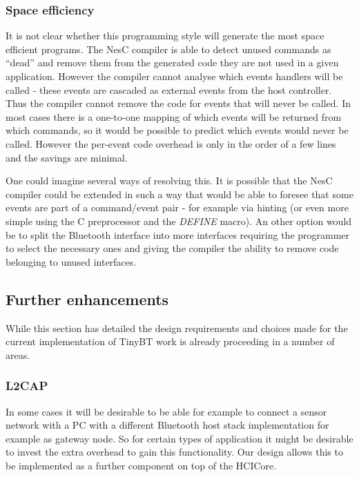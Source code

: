 \documentclass[a4paper,10pt]{article}
\begin{document}
\subsubsection{Space efficiency}
It is not clear whether this programming style will generate the most
space efficient programs.  The NesC compiler is able to detect unused
commands as ``dead'' and remove them from the generated code they are
not used in a given application. However the compiler cannot analyse
which events handlers will be called - these events are cascaded as
external events from the host controller. Thus the compiler cannot
remove the code for events that will never be called.  In most cases
there is a one-to-one mapping of which events will be returned from
which commands, so it would be possible to predict which events would
never be called. However the per-event code overhead is only in the
order of a few lines and the savings are minimal.

One could imagine several ways of resolving this. It is possible that
the NesC compiler could be extended in such a way that would be able
to foresee that some events are part of a command/event pair - for
example via hinting (or even more simple using the C preprocessor and
the \emph{DEFINE} macro). An other option would be to
split the Bluetooth interface into more interfaces requiring the
programmer to select the necessary ones and giving the compiler the
ability to remove code belonging to unused interfaces.

\subsection{Further enhancements}
While this section has detailed the design requirements and choices
made for the current implementation of TinyBT work is already
proceeding in a number of areas.

\subsubsection{L2CAP}
In some cases it will be desirable to be able for example to connect a
sensor network with a PC with a different Bluetooth host stack
implementation for example as gateway node. So for certain types of
application it might be desirable to invest the extra overhead to gain
this functionality. Our design allows this to be implemented as a
further component on top of the HCICore.
\end{document}
